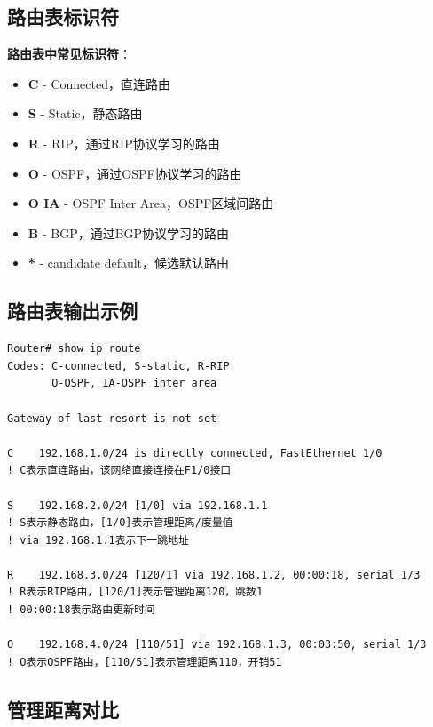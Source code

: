 \documentclass[12pt,a4paper]{ctexart}
\begin{document}
\subsection{路由表标识符}

\begin{keybox}
\textbf{路由表中常见标识符}：
\begin{itemize}[itemsep=0pt]
    \item \textbf{C} - Connected，直连路由
    \item \textbf{S} - Static，静态路由
    \item \textbf{R} - RIP，通过RIP协议学习的路由
    \item \textbf{O} - OSPF，通过OSPF协议学习的路由
    \item \textbf{O IA} - OSPF Inter Area，OSPF区域间路由
    \item \textbf{B} - BGP，通过BGP协议学习的路由
    \item \textbf{*} - candidate default，候选默认路由
\end{itemize}
\end{keybox}

\subsection{路由表输出示例}

\begin{cmdbox}
\begin{lstlisting}
Router# show ip route
Codes: C-connected, S-static, R-RIP
       O-OSPF, IA-OSPF inter area
       
Gateway of last resort is not set

C    192.168.1.0/24 is directly connected, FastEthernet 1/0
! C表示直连路由，该网络直接连接在F1/0接口

S    192.168.2.0/24 [1/0] via 192.168.1.1
! S表示静态路由，[1/0]表示管理距离/度量值
! via 192.168.1.1表示下一跳地址

R    192.168.3.0/24 [120/1] via 192.168.1.2, 00:00:18, serial 1/3
! R表示RIP路由，[120/1]表示管理距离120，跳数1
! 00:00:18表示路由更新时间

O    192.168.4.0/24 [110/51] via 192.168.1.3, 00:03:50, serial 1/3
! O表示OSPF路由，[110/51]表示管理距离110，开销51
\end{lstlisting}
\end{cmdbox}

\subsection{管理距离对比}
\end{document}
